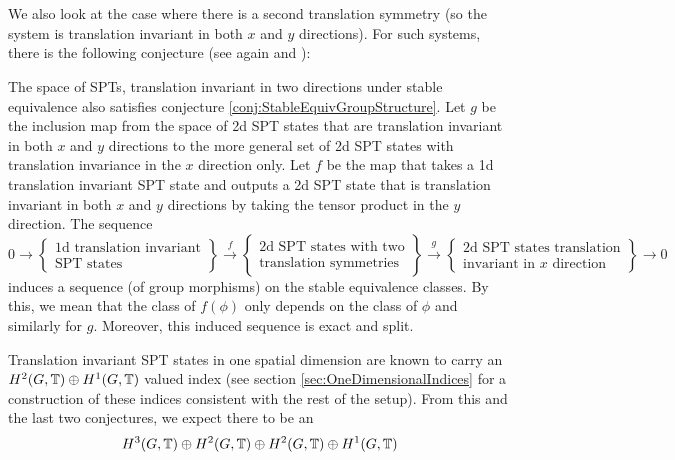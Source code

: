 \documentclass[11pt,a4paper,twoside]{article}
\numberwithin{equation}{section}
\begin{document}
	\\\\
	We also look at the case where there is a second translation symmetry (so the system is translation invariant in both $x$ and $y$ directions). For such systems, there is the following conjecture (see again \cite{xiong2019classification} and \cite{Chen_2013}):
	\begin{conjecture}\label{conj2}
		The space of SPTs, translation invariant in two directions under stable equivalence also satisfies conjecture \ref{conj:StableEquivGroupStructure}. Let $g$ be the inclusion map from the space of 2d SPT states that are translation invariant in both $x$ and $y$ directions to the more general set of 2d SPT states with translation invariance in the $x$ direction only. Let $f$ be the map that takes a 1d translation invariant SPT state and outputs a 2d SPT state that is translation invariant in both $x$ and $y$ directions by taking the tensor product in the $y$ direction. The sequence
		\begin{equation}
			0\rightarrow\left\{\begin{matrix}\text{1d translation invariant}\\ \text{SPT states}\end{matrix}\right\}\stackrel{f}{\rightarrow}\left\{\begin{matrix}\text{2d SPT states with two}\\ \text{translation symmetries}\end{matrix}\right\}\stackrel{g}{\rightarrow}\left\{\begin{matrix}\text{2d SPT states translation}\\ \text{invariant in $x$ direction}\end{matrix}\right\}\rightarrow 0
		\end{equation}
		induces a sequence (of group morphisms) on the stable equivalence classes. By this, we mean that the class of $f(\phi)$ only depends on the class of $\phi$ and similarly for $g$. Moreover, this induced sequence is exact and split.
	\end{conjecture}
	Translation invariant SPT states in one spatial dimension are known to carry an $H^2(G,\mathbb T)\oplus H^1(G,\mathbb T)$ valued index (see section \ref{sec:OneDimensionalIndices} for a construction of these indices consistent with the rest of the setup). From this and the last two conjectures, we expect there to be an
	\begin{equation}\label{eq:2TranslationsIntroduction}
		H^3(G,\mathbb T)\oplus H^2(G,\mathbb T)\oplus H^2(G,\mathbb T)\oplus H^1(G,\mathbb T)
	\end{equation}
\end{document}
